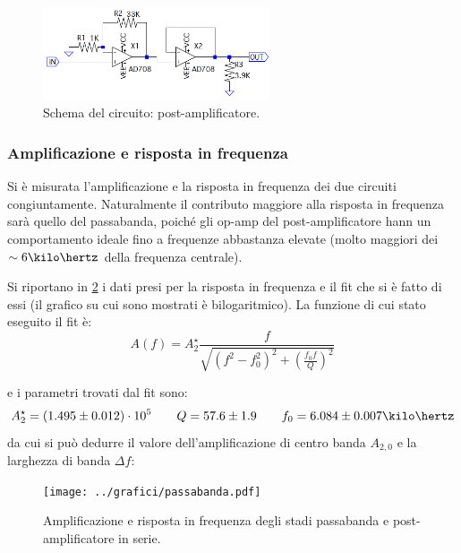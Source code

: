 \documentclass[a4paper,10pt]{article}
\begin{document}
\lipsum[4-5]

\begin{figure}
	\vspace{-10pt}
	\centering
	\includegraphics[width=0.6\textwidth]{../grafici/PostAmp.png}
	\vspace{-12pt}
	\caption{Schema del circuito: post-amplificatore.}
	\label{fig:powamp}
	\vspace{-6pt}
\end{figure}

\lipsum[6-7]

\subsubsection*{Amplificazione e risposta in frequenza}

Si è misurata l'amplificazione e la risposta in frequenza dei due circuiti congiuntamente. Naturalmente il contributo maggiore alla risposta in frequenza sarà quello del passabanda, poiché gli op-amp del post-amplificatore hann un comportamento ideale fino a frequenze abbastanza elevate (molto maggiori dei $\sim 6 \kilo\hertz $ della frequenza centrale).

Si riportano in \cref{fig:bandpass} i dati presi per la risposta in frequenza e il fit che si è fatto di essi (il grafico su cui sono mostrati è bilogaritmico).
La funzione di cui stato eseguito il fit è:
\[ A(f) = A_2^\star \frac{f}{\sqrt{(f^2-f_0^2)^2 + \left(\frac{f_0 f}{Q}\right)^2}} \]

e i parametri trovati dal fit sono:
\[ A_2^\star=(1.495 \pm 0.012)\cdot10^5 \qquad Q=57.6 \pm 1.9 \qquad f_0=6.084 \pm 0.007 \kilo\hertz  \]
da cui si può dedurre il valore dell'amplificazione di centro banda $ A_{2,0} $ e la larghezza di banda $ \Delta f $:

\begin{figure}[H]
	\centering
	\texttt{[image: ../grafici/passabanda.pdf]}
	\vspace*{10pt}
	\caption{Amplificazione e risposta in frequenza degli stadi passabanda e post-amplificatore in serie.}
	\label{fig:bandpass}
\end{figure}
\end{document}
